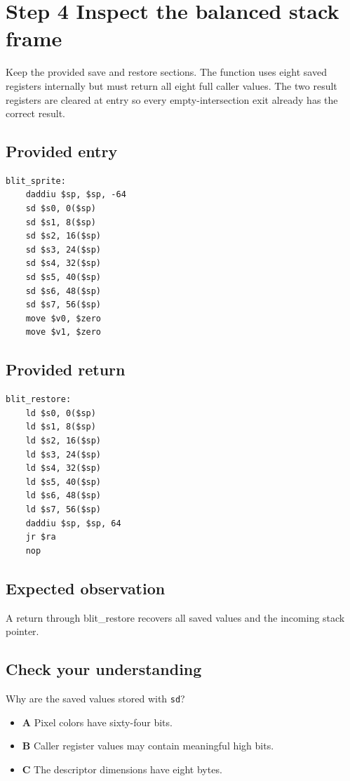 \section{Step 4 Inspect the balanced stack frame}\label{blit-s04}

Keep the provided save and restore sections. The function uses eight saved registers internally but must return all eight full caller values. The two result registers are cleared at entry so every empty-intersection exit already has the correct result.

\subsection{Provided entry}
\begin{verbatim}
blit_sprite:
    daddiu $sp, $sp, -64
    sd $s0, 0($sp)
    sd $s1, 8($sp)
    sd $s2, 16($sp)
    sd $s3, 24($sp)
    sd $s4, 32($sp)
    sd $s5, 40($sp)
    sd $s6, 48($sp)
    sd $s7, 56($sp)
    move $v0, $zero
    move $v1, $zero
\end{verbatim}

\subsection{Provided return}
\begin{verbatim}
blit_restore:
    ld $s0, 0($sp)
    ld $s1, 8($sp)
    ld $s2, 16($sp)
    ld $s3, 24($sp)
    ld $s4, 32($sp)
    ld $s5, 40($sp)
    ld $s6, 48($sp)
    ld $s7, 56($sp)
    daddiu $sp, $sp, 64
    jr $ra
    nop
\end{verbatim}

\subsection{Expected observation}
A return through blit\_restore recovers all saved values and the incoming stack pointer.

\subsection{Check your understanding}
Why are the saved values stored with \texttt{sd}?

\begin{itemize}
  \item \textbf{A} Pixel colors have sixty-four bits.
  \item \textbf{B} Caller register values may contain meaningful high bits.
  \item \textbf{C} The descriptor dimensions have eight bytes.
\end{itemize}
